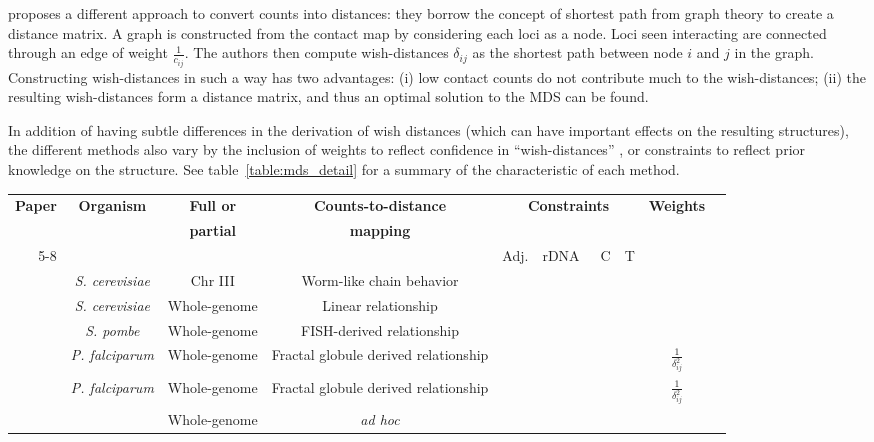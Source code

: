 \documentclass[2columns]{article}
\newcommand*\CHECK{\ding{51}}
\begin{document}
\citet{lesne:3d} proposes a different approach to convert counts into
distances: they borrow the concept of shortest path from graph theory to
create a distance matrix. A graph is constructed from the contact map by
considering each loci as a node. Loci seen interacting are connected through
an edge of weight $\frac{1}{c_{ij}}$. The authors then compute wish-distances
$\delta_{ij}$ as the shortest path between node $i$ and $j$ in the graph.
Constructing wish-distances in such a way has two advantages: (i) low contact
counts do not contribute much to the wish-distances; (ii) the resulting
wish-distances form a distance matrix, and thus an optimal solution to the MDS
can be found.

In addition of having subtle differences in the derivation of wish distances
(which can have important effects on the resulting structures),
the different methods also vary by the inclusion of weights to reflect
confidence in ``wish-distances'' \citep{ay:three-dimensional}, or constraints
to reflect prior knowledge on the structure. See table~\ref{table:mds_detail}
for a summary of the characteristic of each method.

\begin{table*}
\scriptsize
\centering
\begin{tabular}{rccccccccc}
\hline
\multirow{2}{*}{\textbf{Paper}} & \multirow{2}{*}{\textbf{Organism}} &
\textbf{Full or}
& \textbf{Counts-to-distance} &
\multicolumn{4}{c}{\multirow{2}{*}{\textbf{Constraints}}}
& \multirow{2}{*}{\textbf{Weights}}\\
 & & \textbf{partial} & \textbf{mapping} &  \\
 \cmidrule(lr){5-8} 
 & & & & Adj. & rDNA & C & T & \\
\hline
\cite{dekker:capturing} & {\em S. cerevisiae} & Chr III & Worm-like chain
behavior & & & & \\
\cite{duan:three-dimensional} & {\em S. cerevisiae} & Whole-genome & Linear
relationship & \CHECK &  \CHECK & \CHECK &  & \\
\cite{tanizawa:mapping} & {\em S. pombe} & Whole-genome &
FISH-derived relationship & \CHECK & \CHECK & \CHECK & \CHECK &  \\
\cite{ay:three-dimensional} & {\em P. falciparum} & Whole-genome & Fractal
globule derived relationship & \CHECK  & & &
& $\frac{1}{\delta_{ij}^2}$ \\
\cite{peng:sequencing} & {\em P. falciparum} & Whole-genome & Fractal
globule derived relationship & \CHECK  & & &
 & $\frac{1}{\delta_{ij}^2}$ \\
\cite{lesne:3d} & & Whole-genome & \textit{ad hoc} & & & & & \
\end{tabular}
\caption{Differences between MDS-based methods}{}
\label{table:mds_detail}
\end{table*}
\end{document}
